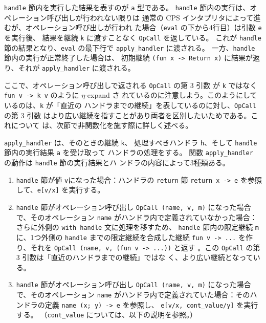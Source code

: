 \texttt{handle} 節内を実行した結果を表すのが \texttt{a} 型である。
\texttt{handle} 節内の実行は、オペレーション呼び出しが行われない限りは
通常の CPS インタプリタによって進むが、オペレーション呼び出しが行われ
た場合（\texttt{eval} の下から4行目）は引数 \texttt{e} を実行後、
結果を継続 \texttt{k} に渡すことなく \texttt{OpCall} を返している。
これが \texttt{handle} 節の結果となり、\texttt{eval} の最下行で
\texttt{apply\_handler} に渡される。
一方、\texttt{handle} 節内の実行が正常終了した場合は、
初期継続 \texttt{(fun x -> Return x)} に結果が返り、それが
\texttt{apply\_handler} に渡される。

ここで、オペレーション呼び出しで返される \texttt{OpCall} の第 3 引数
が \texttt{k} ではなく \texttt{fun v -> k v} のように $\eta$-expand さ
れているのに注意しよう。このようにしているのは、\texttt{k} が「直近の
ハンドラまでの継続」を表しているのに対し、\texttt{OpCall} の第 3 引数
はより広い継続を指すことがあり両者を区別したいためである。これについて
は、次節で非関数化を施す際に詳しく述べる。

\texttt{apply\_handler} は、そのときの継続 \texttt{k}、
処理すべきハンドラ \texttt{h}、そして
\texttt{handle} 節内の実行結果 \texttt{a} を受け取って
ハンドラの処理をする。
関数 \texttt{apply\_handler} の動作は \texttt{handle} 節の実行結果とハ
ンドラの内容によって3種類ある。

\begin{enumerate}
\item \texttt{handle} 節が値 \texttt{v}になった場合：ハンドラの \texttt{return} 節 \texttt{return x -> e} を参照して、\texttt{e[v/x]} を実行する。
\item \texttt{handle} 節がオペレーション呼び出し \texttt{OpCall (name, v, m)} になった場合で、そのオペレーション \texttt{name} がハンドラ内で定義されていなかった場合：
さらに外側の \texttt{with handle} 文に処理を移すため、
\texttt{handle} 節内の限定継続 \texttt{m} に、1つ外側の \texttt{handle} までの限定継続を合成した継続 \texttt{fun v -> ...} を作り、それを \texttt{OpCall (name, v, (fun v -> ...))} と返す
。この \texttt{OpCall} の第 3 引数は「直近のハンドラまでの継続」ではな
く、より広い継続となっている。

\item \texttt{handle} 節がオペレーション呼び出し \texttt{OpCall (name, v, m)} になった場合で、そのオペレーション \texttt{name} がハンドラ内で定義されていた場合：そのハンドラの定義 \texttt{name (x; y) -> e} を参照し、
\texttt{e[v/x, cont\_value/y]} を実行する。
（\texttt{cont\_value} については、以下の説明を参照。）
\end{enumerate}

